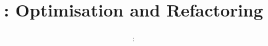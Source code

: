 \usepackage{../../beamerthemeFalmouthGamesAcademy}
\usepackage{multimedia}
\graphicspath{ {../../} }


\usepackage[normalem]{ulem}
\usepackage{wasysym}

\usepackage{pdfpages}

\usetikzlibrary{arrows,automata}




\title{\sessionnumber: Optimisation and Refactoring}
\subtitle{\modulecode: \moduletitle}

\frame{\titlepage} 







